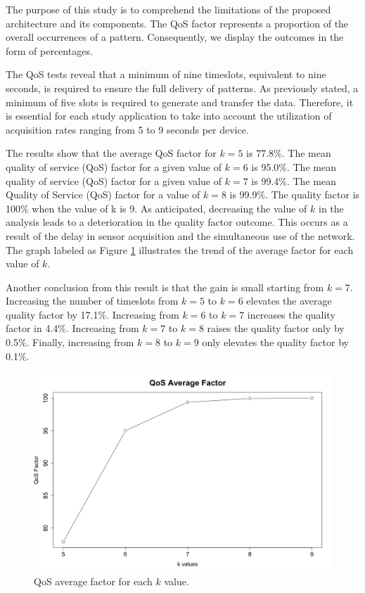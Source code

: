 The purpose of this study is to comprehend the limitations of the proposed architecture and its components. The QoS factor represents a proportion of the overall occurrences of a pattern. Consequently, we display the outcomes in the form of percentages.

The QoS tests reveal that a minimum of nine timeslots, equivalent to nine seconds, is required to ensure the full delivery of patterns. As previously stated, a minimum of five slots is required to generate and transfer the data. Therefore, it is essential for each study application to take into account the utilization of acquisition rates ranging from 5 to 9 seconds per device.

The results show that the average QoS factor for $k = 5$ is 77.8\%. The mean quality of service (QoS) factor for a given value of $k = 6$ is 95.0\%. The mean quality of service (QoS) factor for a given value of $k = 7$ is 99.4\%. The mean Quality of Service (QoS) factor for a value of $k = 8$ is 99.9\%. The quality factor is 100\% when the value of k is 9. As anticipated, decreasing the value of $k$ in the analysis leads to a deterioration in the quality factor outcome. This occurs as a result of the delay in sensor acquisition and the simultaneous use of the network. The graph labeled as Figure \ref{fig:QoS_average} illustrates the trend of the average factor for each value of $k$.

Another conclusion from this result is that the gain is small starting from $k = 7$. Increasing the number of timeslots from $k = 5$ to $k = 6$ elevates the average quality factor by 17.1\%. Increasing from $k = 6$ to $k = 7$ increases the quality factor in 4.4\%. Increasing from $k = 7$ to $k = 8$ raises the quality factor only by 0.5\%. Finally, increasing from $k = 8$ to $k = 9$ only elevates the quality factor by 0.1\%.

\begin{figure}[ht!]
    \centering
    \includegraphics[width = .7\linewidth]{Figures/QoS-average.png}
    \caption{QoS average factor for each $k$ value.}
    \label{fig:QoS_average}
\end{figure}

